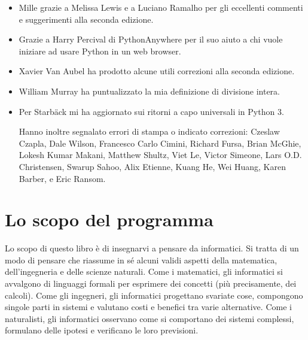 \documentclass[10pt]{book}
\begin{document}
\begin{itemize}
\item Mille grazie a Melissa Lewis e a Luciano Ramalho per gli eccellenti commenti e suggerimenti alla seconda edizione.

\item Grazie a Harry Percival di PythonAnywhere per il suo aiuto a chi vuole iniziare ad usare Python in un web browser.

\item Xavier Van Aubel ha prodotto alcune utili correzioni alla seconda edizione.

\item William Murray ha puntualizzato la mia definizione di divisione intera.

\item Per Starb{\"a}ck mi ha aggiornato sui ritorni a capo universali in Python 3.


Hanno inoltre segnalato errori di stampa o indicato correzioni:
Czeslaw Czapla, Dale Wilson, Francesco Carlo Cimini, Richard Fursa, Brian McGhie, Lokesh Kumar Makani, Matthew Shultz, Viet Le, Victor Simeone, Lars O.D. Christensen, Swarup Sahoo, Alix Etienne, Kuang He, Wei Huang, Karen Barber, e Eric Ransom.

\end{itemize}

\normalsize
\clearemptydoublepage

\begin{latexonly}

\tableofcontents

\clearemptydoublepage

\end{latexonly}

\mainmatter

\chapter{Lo scopo del programma}

Lo scopo di questo libro è di insegnarvi a pensare da informatici. Si tratta di un modo di pensare che riassume in sé alcuni validi aspetti della matematica, dell'ingegneria e delle scienze naturali. Come i matematici, gli informatici si avvalgono di linguaggi formali per esprimere dei concetti (più precisamente, dei calcoli). Come gli ingegneri, gli informatici progettano svariate cose, compongono singole parti in sistemi e valutano costi e benefici tra varie alternative. Come i naturalisti, gli informatici osservano come si comportano dei sistemi complessi, formulano delle ipotesi e verificano le loro previsioni.
\end{document}
